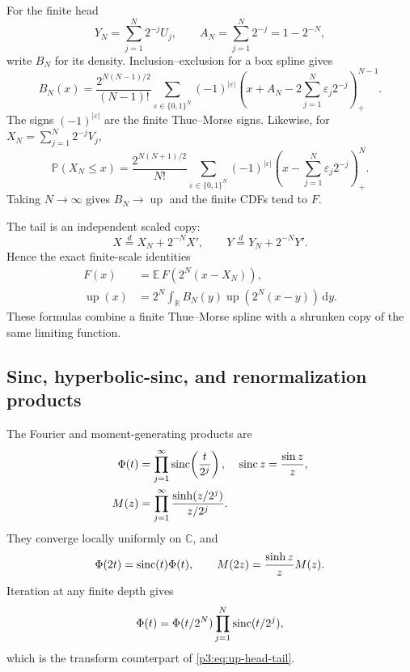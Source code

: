 \documentclass[11pt]{article}
\theoremstyle{definition}
\theoremstyle{remark}
\newcommand{\R}{\mathbb R}
\newcommand{\C}{\mathbb C}
\newcommand{\E}{\mathbb E}
\newcommand{\Prob}{\mathbb P}
\newcommand{\dd}{\,\mathrm d}
\newcommand{\Up}{\operatorname{up}}
\begin{document}
For the finite head
\[
 Y_N=\sum_{j=1}^N2^{-j}U_j,
 \qquad A_N=\sum_{j=1}^N2^{-j}=1-2^{-N},
\]
write $B_N$ for its density.  Inclusion--exclusion for a box spline gives
\begin{equation}\label{p3:eq:BN-truncated-power}
 B_N(x)=\frac{2^{N(N-1)/2}}{(N-1)!}
 \sum_{\varepsilon\in\{0,1\}^N}(-1)^{|\varepsilon|}
 \left(x+A_N-2\sum_{j=1}^N\varepsilon_j2^{-j}\right)_+^{N-1}.
\end{equation}
The signs $(-1)^{|\varepsilon|}$ are the finite Thue--Morse signs.  Likewise,
for $X_N=\sum_{j=1}^N2^{-j}V_j$,
\begin{equation}\label{p3:eq:FN-truncated-power}
 \Prob(X_N\le x)=\frac{2^{N(N+1)/2}}{N!}
 \sum_{\varepsilon\in\{0,1\}^N}(-1)^{|\varepsilon|}
 \left(x-\sum_{j=1}^N\varepsilon_j2^{-j}\right)_+^N.
\end{equation}
Taking $N\to\infty$ gives $B_N\to\Up$ and the finite CDFs tend to $F$.

The tail is an independent scaled copy:
\begin{equation}\label{p3:eq:head-tail}
 X\overset d=X_N+2^{-N}X',\qquad
 Y\overset d=Y_N+2^{-N}Y'.
\end{equation}
Hence the exact finite-scale identities
\begin{align}
 F(x)&=\E\,F\!\left(2^N(x-X_N)\right),\label{p3:eq:F-head-tail}\\
 \Up(x)&=2^N\int_\R B_N(y)\Up\!\left(2^N(x-y)\right)\dd y.\label{p3:eq:up-head-tail}
\end{align}
These formulas combine a finite Thue--Morse spline with a shrunken copy of the
same limiting function.

\subsection{Sinc, hyperbolic-sinc, and renormalization products}

The Fourier and moment-generating products are
\begin{align}
 \Phi(t)&=\prod_{j=1}^\infty\operatorname{sinc}\!\left(\frac{t}{2^j}\right),
 &\operatorname{sinc} z&=\frac{\sin z}{z},\label{p3:eq:Phi-sinc-product}\\
 M(z)&=\prod_{j=1}^\infty\frac{\sinh(z/2^j)}{z/2^j}.
 \label{p3:eq:M-sinh-product}
\end{align}
They converge locally uniformly on $\C$, and
\begin{equation}\label{p3:eq:renormalization-products}
 \Phi(2t)=\operatorname{sinc}(t)\Phi(t),\qquad
 M(2z)=\frac{\sinh z}{z}M(z).
\end{equation}
Iteration at any finite depth gives
\begin{equation}\label{p3:eq:finite-tail-product}
 \Phi(t)=\Phi(t/2^N)\prod_{j=1}^N\operatorname{sinc}(t/2^j),
\end{equation}
which is the transform counterpart of \eqref{p3:eq:up-head-tail}.
\end{document}
